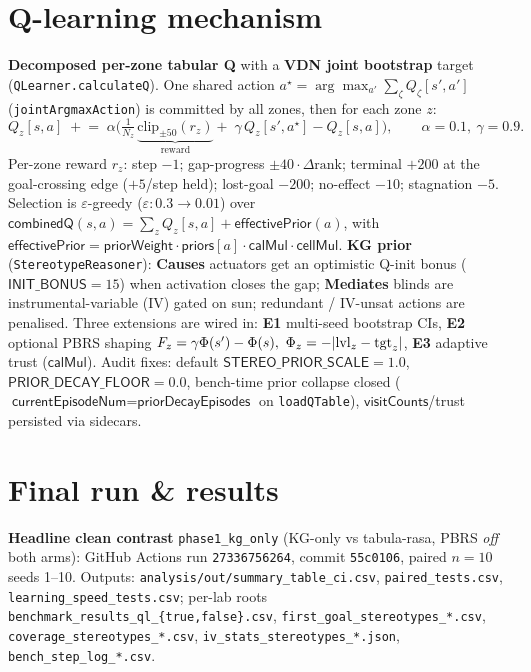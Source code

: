 \documentclass[10pt,a4paper]{article}
\newcommand{\file}[1]{\texttt{\small #1}}
\newcommand{\kw}[1]{\textbf{#1}}
\begin{document}
\section{Q-learning mechanism}
\kw{Decomposed per-zone tabular Q} with a \kw{VDN joint bootstrap} target (\file{QLearner.calculateQ}).
One shared action \(a^\star=\arg\max_{a'}\sum_\zeta Q_\zeta[s',a']\) (\file{jointArgmaxAction}) is committed
by all zones, then for each zone \(z\):
\[
Q_z[s,a]\;\mathrel{+}=\;\alpha\Big(\tfrac{1}{N_z}\,\underbrace{\mathrm{clip}_{\pm50}(r_z)}_{\text{reward}}
+\;\gamma\,Q_z[s',a^\star]-Q_z[s,a]\Big),\qquad \alpha=0.1,\ \gamma=0.9 .
\]
Per-zone reward \(r_z\): step \(-1\); gap-progress \(\pm40\cdot\Delta\text{rank}\); terminal \(+200\) at the
goal-crossing edge (\(+5\)/step held); lost-goal \(-200\); no-effect \(-10\); stagnation \(-5\). Selection is
\(\varepsilon\)-greedy (\(\varepsilon:0.3\!\to\!0.01\)) over
\(\textsf{combinedQ}(s,a)=\sum_z Q_z[s,a]+\textsf{effectivePrior}(a)\), with
\(\textsf{effectivePrior}=\textsf{priorWeight}\cdot\textsf{priors}[a]\cdot\textsf{calMul}\cdot\textsf{cellMul}\).
\kw{KG prior} (\file{StereotypeReasoner}): \kw{Causes} actuators get an optimistic Q-init bonus
(\(\textsf{INIT\_BONUS}=15\)) when activation closes the gap; \kw{Mediates} blinds are instrumental-variable
(IV) gated on sun; redundant / IV-unsat actions are penalised. Three extensions are wired in: \kw{E1}
multi-seed bootstrap CIs, \kw{E2} optional PBRS shaping \(F_z=\gamma\Phi(s')-\Phi(s),\ \Phi_z=-|{\rm lvl}_z-{\rm tgt}_z|\),
\kw{E3} adaptive trust (\(\textsf{calMul}\)). Audit fixes: default \(\textsf{STEREO\_PRIOR\_SCALE}=1.0\),
\(\textsf{PRIOR\_DECAY\_FLOOR}=0.0\), bench-time prior collapse closed (\(\textsf{currentEpisodeNum}=\textsf{priorDecayEpisodes}\)
on \file{loadQTable}), \(\textsf{visitCounts}\)/trust persisted via sidecars.

\section{Final run \& results}
\kw{Headline clean contrast} \file{phase1\_kg\_only} (KG-only vs tabula-rasa, PBRS \emph{off} both arms):
GitHub Actions run \texttt{27336756264}, commit \texttt{55c0106}, paired \(n{=}10\) seeds 1--10.
Outputs: \file{analysis/out/summary\_table\_ci.csv}, \file{paired\_tests.csv}, \file{learning\_speed\_tests.csv};
per-lab roots \file{benchmark\_results\_ql\_\{true,false\}.csv}, \file{first\_goal\_stereotypes\_*.csv},
\file{coverage\_stereotypes\_*.csv}, \file{iv\_stats\_stereotypes\_*.json}, \file{bench\_step\_log\_*.csv}.
\end{document}
